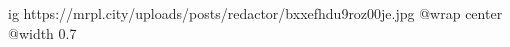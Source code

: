  
 
 
 
 

\ifcmt
  ig https://mrpl.city/uploads/posts/redactor/bxxefhdu9roz00je.jpg
  @wrap center
  @width 0.7
\fi
